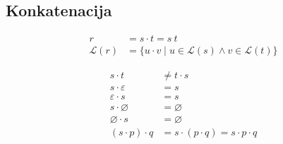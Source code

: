 \documentclass{report}
\newcounter{example}
\newcommand{\Reset}{\setcounter{example}{1}}
\newcommand{\Empty}{\varnothing}
\newcommand{\Null}{\varepsilon}
\newcommand{\Language}[1]{\mathcal{L}(#1)}
\newcommand{\Automaton}[1]{\mathcal{M}(#1)}
\newcommand{\Char}[1]{\texttt{#1}}
\newcommand{\Seq}{\cdot}
\newcommand{\Pos}{\mathop{\mdsmblkcircle}}
\newcommand{\Spc}{\ }
\newcommand{\Set}[1]{#1}
\newlength{\arrow}
\newcommand{\MoveX}[1]{\xrightarrow{\mathmakebox[\arrow]{#1}}}
\newcommand{\RE}[1]{{#1}}
\begin{document}
%

\subsection{Konkatenacija}
\Reset

\begin{tcolorbox}[title={Definicija}]
\begin{equation*}
  \begin{aligned}
  r &= s \Seq t = s \Spc t\\
  \Language{r} &= \{ u \Seq v \mid u \in \Language{s} \land v \in \Language{t}\}
  \end{aligned}
\end{equation*}
\end{tcolorbox}

\begin{tcolorbox}[title={Pravila}]
\begin{equation*}
  \begin{aligned}
  s \Seq t &\not= t \Seq s\\
  s \Seq \Null &= s \\
  \Null \Seq s &= s   \\
  s \Seq \Empty &= \Empty \\
  \Empty \Seq s &= \Empty \\
  (s \Seq p) \Seq q &= s \Seq (p \Seq q) = s \Seq p \Seq q
  \end{aligned}
\end{equation*}
\end{tcolorbox}
\end{document}
